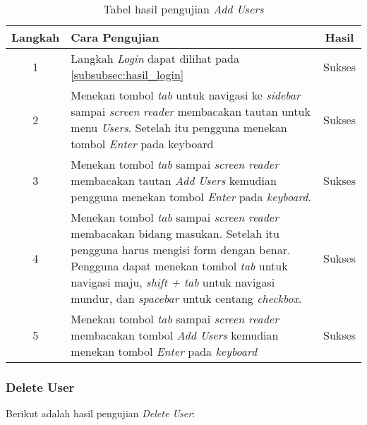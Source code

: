 \begin{table}[H]
	\centering
	\caption{Tabel hasil pengujian \textit{Add Users}}
	\label{tab:hasil_add_users}
	\begin{tabular}{|c|p{12cm}|c|}
		\toprule
		Langkah & Cara Pengujian & Hasil \\
		\midrule
		1 & Langkah \textit{Login} dapat dilihat pada \ref{subsubsec:hasil_login} & Sukses\\
		2 & Menekan tombol \textit{tab} untuk navigasi ke \textit{sidebar} sampai \textit{screen reader} membacakan tautan untuk menu \textit{Users}. Setelah itu pengguna menekan tombol \textit{Enter} pada keyboard & Sukses\\
		3 & Menekan tombol \textit{tab} sampai \textit{screen reader} membacakan tautan \textit{Add Users} kemudian pengguna menekan tombol \textit{Enter} pada \textit{keyboard}. & Sukses\\
		4 & Menekan tombol \textit{tab} sampai \textit{screen reader} membacakan bidang masukan. Setelah itu pengguna harus mengisi form dengan benar. Pengguna dapat menekan tombol \textit{tab} untuk navigasi maju, \textit{shift + tab} untuk navigasi mundur, dan \textit{spacebar} untuk centang \textit{checkbox}. & Sukses\\
		5 & Menekan tombol \textit{tab} sampai \textit{screen reader} membacakan tombol \textit{Add Users} kemudian menekan tombol \textit{Enter} pada \textit{keyboard} & Sukses\\
		\bottomrule
	\end{tabular}
\end{table}

\subsubsection{Delete User}
\label{subsubsec:hasil_delete_user}
Berikut adalah hasil pengujian \textit{Delete User}:

